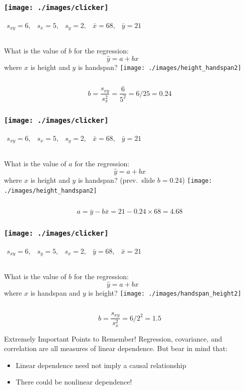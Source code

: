 \begin{frame}
\frametitle{\texttt{[image: ./images/clicker]}}
$\begin{array}{ccccc} s_{xy} = 6,&s_x = 5,& s_y = 2,& \bar{x} = 68,& \bar{y} = 21\end{array}$
\begin{columns}[c]
\column{2.5in}
What is the value of $b$ for the regression: $$\hat{y}=a+bx$$
where $x$ is height and $y$ is handspan?
\column{1.8in}
\texttt{[image: ./images/height\_handspan2]}
\end{columns}

\pause

\alert{$$b = \frac{s_{xy}}{s_x^2} = \frac{6}{5^2} = 6/25 = 0.24 $$}
\end{frame}

\begin{frame}
\frametitle{\texttt{[image: ./images/clicker]}}
$\begin{array}{ccccc} s_{xy} = 6,&s_x = 5,& s_y = 2,& \bar{x} = 68,& \bar{y} = 21\end{array}$
\begin{columns}[c]
\column{2.5in}
What is the value of $a$ for the regression: $$\hat{y}=a+bx$$
where $x$ is height and $y$ is handspan? (prev.\ slide $b = 0.24$)
\column{1.8in}
\texttt{[image: ./images/height\_handspan2]}
\end{columns}

\pause

\alert{$$a = \bar{y} - b \bar{x} = 21 - 0.24 \times 68 = 4.68 $$}

\end{frame}


\begin{frame}
\frametitle{\texttt{[image: ./images/clicker]}}
\alert{$\begin{array}{ccccc} s_{xy} = 6,&s_y = 5,& s_x = 2,& \bar{y} = 68,& \bar{x} = 21\end{array}$}
\begin{columns}[c]
\column{2.5in}
What is the value of $b$ for the regression: $$\hat{y}=a+bx$$
where \alert{$x$ is handspan and $y$ is height? }
\column{1.8in}
\texttt{[image: ./images/handspan\_height2]}
\end{columns}

\pause
\alert{$$b = \frac{s_{xy}}{s_x^2} = 6 /2^2 = 1.5 $$}

\end{frame}
\begin{frame}{Extremely Important Points to Remember!}
Regression, covariance, and correlation are all \alert{measures of linear dependence}. But bear in mind that:
	\begin{itemize}
    \item Linear dependence \alert{need not} imply a causal relationship 
    \item There could be \alert{nonlinear} dependence!
	\end{itemize}


\end{frame}

